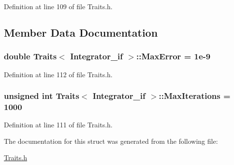 Definition at line 109 of file Traits.\-h.



\subsection{Member Data Documentation}
\hypertarget{struct_traits_3_01_integrator__if_01_4_a32e086683b5e71dd7be4225d717d22a2}{
\subsubsection[{Max\-Error}]{\setlength{\rightskip}{0pt plus 5cm}double {\bf Traits}$<$ {\bf Integrator\-\_\-if} $>$\-::Max\-Error = 1e-\/9}}\label{struct_traits_3_01_integrator__if_01_4_a32e086683b5e71dd7be4225d717d22a2}


Definition at line 112 of file Traits.\-h.

\hypertarget{struct_traits_3_01_integrator__if_01_4_a00ccc8b3ca58fdd91a0b40c59a02879b}{
\subsubsection[{Max\-Iterations}]{\setlength{\rightskip}{0pt plus 5cm}unsigned int {\bf Traits}$<$ {\bf Integrator\-\_\-if} $>$\-::Max\-Iterations = 1000}}\label{struct_traits_3_01_integrator__if_01_4_a00ccc8b3ca58fdd91a0b40c59a02879b}


Definition at line 111 of file Traits.\-h.



The documentation for this struct was generated from the following file\-:\begin{DoxyCompactItemize}
\item 
\hyperlink{_traits_8h}{Traits.\-h}\end{DoxyCompactItemize}
